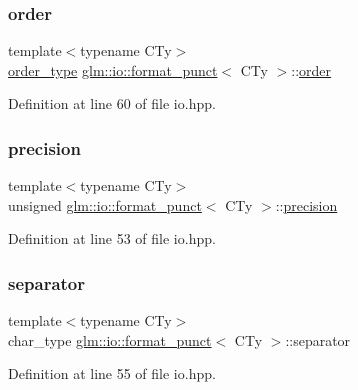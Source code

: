 \subsubsection{\texorpdfstring{order}{order}}
{\footnotesize\ttfamily template$<$typename C\+Ty$>$ \\
\mbox{\hyperlink{namespaceglm_1_1io_a3497781803fe594a37177e05ab2a795f}{order\+\_\+type}} \mbox{\hyperlink{classglm_1_1io_1_1format__punct}{glm\+::io\+::format\+\_\+punct}}$<$ C\+Ty $>$\+::\mbox{\hyperlink{structglm_1_1io_1_1order}{order}}}



Definition at line 60 of file io.\+hpp.

\mbox{\label{classglm_1_1io_1_1format__punct_a5a15d396b7c963df9dec5e124236dc02}} 
\subsubsection{\texorpdfstring{precision}{precision}}
{\footnotesize\ttfamily template$<$typename C\+Ty$>$ \\
unsigned \mbox{\hyperlink{classglm_1_1io_1_1format__punct}{glm\+::io\+::format\+\_\+punct}}$<$ C\+Ty $>$\+::\mbox{\hyperlink{structglm_1_1io_1_1precision}{precision}}}



Definition at line 53 of file io.\+hpp.

\mbox{\label{classglm_1_1io_1_1format__punct_ac561eb04fc2a1282ef38ea15f8e640ee}} 
\subsubsection{\texorpdfstring{separator}{separator}}
{\footnotesize\ttfamily template$<$typename C\+Ty$>$ \\
char\+\_\+type \mbox{\hyperlink{classglm_1_1io_1_1format__punct}{glm\+::io\+::format\+\_\+punct}}$<$ C\+Ty $>$\+::separator}



Definition at line 55 of file io.\+hpp.

